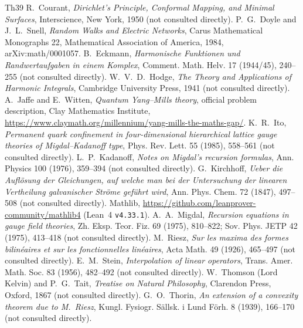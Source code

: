 \documentclass[11pt,a4paper]{article}
\theoremstyle{definition}
\theoremstyle{remark}
\newcommand{\code}[1]{\texttt{#1}}
\begin{document}
\begin{thebibliography}{Th39}
 R.~Courant, \emph{Dirichlet's Principle, Conformal Mapping, and Minimal Surfaces}, Interscience, New York, 1950 (not consulted directly).
 P.~G.~Doyle and J.~L.~Snell, \emph{Random Walks and Electric Networks}, Carus Mathematical Monographs 22, Mathematical Association of America, 1984, arXiv:math/0001057.
 B.~Eckmann, \emph{Harmonische Funktionen und Randwertaufgaben in einem Komplex}, Comment. Math. Helv. 17 (1944/45), 240--255 (not consulted directly).
 W.~V.~D.~Hodge, \emph{The Theory and Applications of Harmonic Integrals}, Cambridge University Press, 1941 (not consulted directly).
 A.~Jaffe and E.~Witten, \emph{Quantum Yang--Mills theory}, official problem description, Clay Mathematics Institute, \url{https://www.claymath.org/millennium/yang-mills-the-maths-gap/}.
 K.~R.~Ito, \emph{Permanent quark confinement in four-dimensional hierarchical lattice gauge theories of Migdal--Kadanoff type}, Phys. Rev. Lett. 55 (1985), 558--561 (not consulted directly).
 L.~P.~Kadanoff, \emph{Notes on Migdal's recursion formulas}, Ann. Physics 100 (1976), 359--394 (not consulted directly).
 G.~Kirchhoff, \emph{Ueber die Aufl\"osung der Gleichungen, auf welche man bei der Untersuchung der linearen Vertheilung galvanischer Str\"ome gef\"uhrt wird}, Ann. Phys. Chem. 72 (1847), 497--508 (not consulted directly).
 Mathlib, \url{https://github.com/leanprover-community/mathlib4} (Lean~4 \code{v4.33.1}).
 A.~A.~Migdal, \emph{Recursion equations in gauge field theories}, Zh. Eksp. Teor. Fiz. 69 (1975), 810--822; Sov. Phys. JETP 42 (1975), 413--418 (not consulted directly).
 M.~Riesz, \emph{Sur les maxima des formes bilin\'eaires et sur les fonctionnelles lin\'eaires}, Acta Math. 49 (1926), 465--497 (not consulted directly).
 E.~M.~Stein, \emph{Interpolation of linear operators}, Trans. Amer. Math. Soc. 83 (1956), 482--492 (not consulted directly).
 W.~Thomson (Lord Kelvin) and P.~G.~Tait, \emph{Treatise on Natural Philosophy}, Clarendon Press, Oxford, 1867 (not consulted directly).
 G.~O.~Thorin, \emph{An extension of a convexity theorem due to M.~Riesz}, Kungl. Fysiogr. S\"allsk. i Lund F\"orh. 8 (1939), 166--170 (not consulted directly).
\end{thebibliography}
\end{document}
